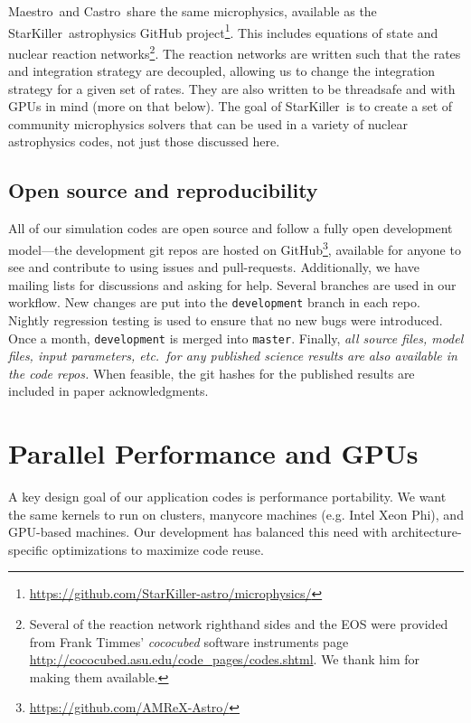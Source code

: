 \documentclass[a4paper]{jpconf}
\newcommand{\maestro}{{\sffamily Maestro}}
\newcommand{\castro}{{\sffamily Castro}}
\newcommand{\starkiller}{{\sffamily StarKiller}}
\begin{document}
\maestro\ and \castro\ share the same microphysics, available as the
\starkiller\ astrophysics GitHub
project\footnote{\url{https://github.com/StarKiller-astro/microphysics/}}.
This includes equations of state and nuclear reaction
networks\footnote{Several of the reaction network righthand sides and
  the EOS were provided from Frank Timmes' {\em cococubed} software
  instruments page
  \url{http://cococubed.asu.edu/code_pages/codes.shtml}.  We thank him
  for making them available.}.  The reaction networks are written such
that the rates and integration strategy are decoupled, allowing us to
change the integration strategy for a given set of rates.  They are
also written to be threadsafe and with GPUs in mind (more on that
below).  The goal of \starkiller\ is to create a set of community
microphysics solvers that can be used in a variety of nuclear
astrophysics codes, not just those discussed here.


\subsection{Open source and reproducibility}

All of our simulation codes are open source and follow a fully open
development model---the development git repos are hosted on
GitHub\footnote{\url{https://github.com/AMReX-Astro/}}, available for
anyone to see and contribute to using issues and pull-requests.
Additionally, we have mailing lists for discussions and asking for
help.  Several branches are used in our workflow.  New changes are put
into the {\tt development} branch in each repo.  Nightly regression
testing is used to ensure that no new bugs were introduced.  Once a
month, {\tt development} is merged into {\tt master}.  Finally, {\em all source
  files, model files, input parameters, etc.\ for any published
  science results are also available in the code repos.}  When
feasible, the git hashes for the published results are included in
paper acknowledgments.




\section{Parallel Performance and GPUs}


A key design goal of our application codes is performance portability.
We want the same kernels to run on clusters, manycore machines (e.g.
Intel Xeon Phi), and GPU-based machines.  Our development has balanced this
need with architecture-specific optimizations to maximize code reuse.
\end{document}
